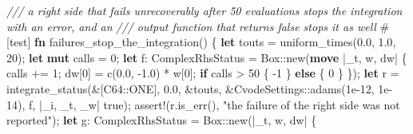 \documentclass[
  10pt,
]{article}
\newenvironment{Shaded}{}{}
\newcommand{\AttributeTok}[1]{\textcolor[rgb]{0.49,0.56,0.16}{#1}}
\newcommand{\CommentTok}[1]{\textcolor[rgb]{0.38,0.63,0.69}{\textit{#1}}}
\newcommand{\ConstantTok}[1]{\textcolor[rgb]{0.53,0.00,0.00}{#1}}
\newcommand{\ControlFlowTok}[1]{\textcolor[rgb]{0.00,0.44,0.13}{\textbf{#1}}}
\newcommand{\DataTypeTok}[1]{\textcolor[rgb]{0.56,0.13,0.00}{#1}}
\newcommand{\DecValTok}[1]{\textcolor[rgb]{0.25,0.63,0.44}{#1}}
\newcommand{\KeywordTok}[1]{\textcolor[rgb]{0.00,0.44,0.13}{\textbf{#1}}}
\newcommand{\NormalTok}[1]{#1}
\newcommand{\OperatorTok}[1]{\textcolor[rgb]{0.40,0.40,0.40}{#1}}
\newcommand{\PreprocessorTok}[1]{\textcolor[rgb]{0.74,0.48,0.00}{#1}}
\newcommand{\StringTok}[1]{\textcolor[rgb]{0.25,0.44,0.63}{#1}}
\begin{document}
\begin{Shaded}
\begin{Highlighting}[]
    \CommentTok{/// a right side that fails unrecoverably after 50 evaluations stops the integration with an error, and an}
    \CommentTok{/// output function that returns false stops it as well}
    \AttributeTok{\#[}\NormalTok{test}\AttributeTok{]}
    \KeywordTok{fn}\NormalTok{ failures\_stop\_the\_integration() }\OperatorTok{\{}
        \KeywordTok{let}\NormalTok{ touts }\OperatorTok{=}\NormalTok{ uniform\_times(}\DecValTok{0.0}\OperatorTok{,} \DecValTok{1.0}\OperatorTok{,} \DecValTok{20}\NormalTok{)}\OperatorTok{;}
        \KeywordTok{let} \KeywordTok{mut}\NormalTok{ calls }\OperatorTok{=} \DecValTok{0}\OperatorTok{;}
        \KeywordTok{let}\NormalTok{ f}\OperatorTok{:}\NormalTok{ ComplexRhsStatus }\OperatorTok{=} \DataTypeTok{Box}\PreprocessorTok{::}\NormalTok{new(}\KeywordTok{move} \OperatorTok{|}\NormalTok{\_t}\OperatorTok{,}\NormalTok{ w}\OperatorTok{,}\NormalTok{ dw}\OperatorTok{|} \OperatorTok{\{}
\NormalTok{            calls }\OperatorTok{+=} \DecValTok{1}\OperatorTok{;}
\NormalTok{            dw[}\DecValTok{0}\NormalTok{] }\OperatorTok{=}\NormalTok{ c(}\DecValTok{0.0}\OperatorTok{,} \OperatorTok{{-}}\DecValTok{1.0}\NormalTok{) }\OperatorTok{*}\NormalTok{ w[}\DecValTok{0}\NormalTok{]}\OperatorTok{;}
            \ControlFlowTok{if}\NormalTok{ calls }\OperatorTok{\textgreater{}} \DecValTok{50} \OperatorTok{\{}
                \OperatorTok{{-}}\DecValTok{1}
            \OperatorTok{\}} \ControlFlowTok{else} \OperatorTok{\{}
                \DecValTok{0}
            \OperatorTok{\}}
        \OperatorTok{\}}\NormalTok{)}\OperatorTok{;}
        \KeywordTok{let}\NormalTok{ r }\OperatorTok{=}\NormalTok{ integrate\_status(}\OperatorTok{\&}\NormalTok{[}\PreprocessorTok{C64::}\NormalTok{ONE]}\OperatorTok{,} \DecValTok{0.0}\OperatorTok{,} \OperatorTok{\&}\NormalTok{touts}\OperatorTok{,} \OperatorTok{\&}\PreprocessorTok{CvodeSettings::}\NormalTok{adams(}\DecValTok{1e{-}12}\OperatorTok{,} \DecValTok{1e{-}14}\NormalTok{)}\OperatorTok{,}\NormalTok{ f}\OperatorTok{,} \OperatorTok{|}\NormalTok{\_i}\OperatorTok{,}\NormalTok{ \_t}\OperatorTok{,}\NormalTok{ \_w}\OperatorTok{|} \ConstantTok{true}\NormalTok{)}\OperatorTok{;}
        \PreprocessorTok{assert!}\NormalTok{(r}\OperatorTok{.}\NormalTok{is\_err()}\OperatorTok{,} \StringTok{"the failure of the right side was not reported"}\NormalTok{)}\OperatorTok{;}
        \KeywordTok{let}\NormalTok{ g}\OperatorTok{:}\NormalTok{ ComplexRhsStatus }\OperatorTok{=} \DataTypeTok{Box}\PreprocessorTok{::}\NormalTok{new(}\OperatorTok{|}\NormalTok{\_t}\OperatorTok{,}\NormalTok{ w}\OperatorTok{,}\NormalTok{ dw}\OperatorTok{|} \OperatorTok{\{}

\end{Highlighting}
\end{Shaded}
\end{document}
